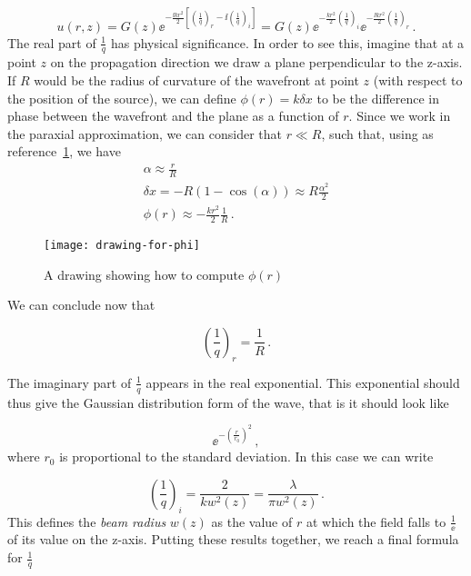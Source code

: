 \documentclass[12pt, class=report, crop=false]{standalone}
\begin{document}
\begin{equation}
  u(r,z) = G(z) \ee^{- \frac{\ii k r^2}{2} \left[ \left(\frac{1}{q} \right)_r - \ii \left(\frac{1}{q} \right)_i \right]} = G(z) \ee^{-\frac{kr^2}{2} \left(\frac{1}{q} \right)_i} \ee^{- \frac{\ii k r^2}{2} \left(\frac{1}{q} \right)_r}\,.
\end{equation}
The real part of \(\frac{1}{q}\) has physical significance. In order to see this, imagine that at a point \(z\) on the propagation direction we draw a plane perpendicular to the z-axis. If \(R\) would be the radius of curvature of the wavefront at point \(z\) (with respect to the position of the source), we can define \(\phi(r) = k \delta x\) to be the difference in phase between the wavefront and the plane as a function of \(r\). Since we work in the paraxial approximation, we can consider that \(r\ll R\), such that, using as reference~\cref{fig:phi-of-r}, we have
\begin{subequations}
  \begin{align}
    \alpha \approx \frac{r}{R} \\
    \delta x = - R (1-\cos(\alpha)) \approx R \frac{\alpha^2}{2} \\
    \phi (r) \approx - \frac{k r^2}{2} \frac{1}{R}\,.
  \end{align}
\end{subequations}
\begin{figure}[h]
  \centering
  \texttt{[image: drawing-for-phi]}%
  \caption{A drawing showing how to compute \(\phi(r)\)}\label{fig:phi-of-r}%
\end{figure}
We can conclude now that

\begin{equation}
  \left( \frac{1}{q} \right)_r = \frac{1}{R}\,.
\end{equation}

The imaginary part of \(\frac{1}{q}\) appears in the real exponential. This exponential should thus give the Gaussian distribution form of the wave, that is it should look like

\begin{equation}
  \ee^{-\left( \frac{r}{r_0} \right)^2}\,,
\end{equation}
where \(r_0\) is proportional to the standard deviation. In this case we can write

\begin{equation}
  \left(\frac{1}{q}\right)_i = \frac{2}{k w^2 (z)} = \frac{\lambda}{\pi w^2 (z)}\,.
\end{equation}
This defines the \textit{beam radius} \(w(z)\) as the value of \(r\) at which the field falls to \(\frac{1}{\ee}\) of its value on the z-axis. Putting these results together, we reach a final formula for \(\frac{1}{q}\)
\end{document}

